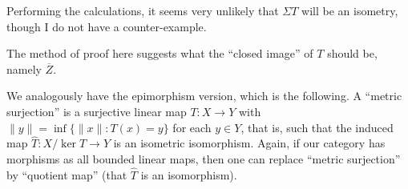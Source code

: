 \documentclass[a4paper,11pt]{article}
\theoremstyle{plain}
\theoremstyle{remark}
\newenvironment{remark}
  {\pushQED{\qed}\renewcommand{\qedsymbol}{$\triangle$}\remarkx}
  {\popQED\endremarkx}
\begin{document}
\begin{remark}
Performing the calculations, it seems very unlikely that $\Sigma T$ will be an isometry, though I do not have a counter-example.

The method of proof here suggests what the ``closed image'' of $T$ should be, namely $\overline Z$.
\end{remark}

We analogously have the epimorphism version, which is the following.  A ``metric surjection'' is a surjective linear map $T\colon X\to Y$ with $\|y\| = \inf\{ \|x\| : T(x)=y \}$ for each $y\in Y$, that is, such that the induced map $\hat T \colon X/\ker T \to Y$ is an isometric isomorphism.  Again, if our category has morphisms as all bounded linear maps, then one can replace ``metric surjection'' by ``quotient map'' (that $\hat T$ is an isomorphism).
\end{document}
